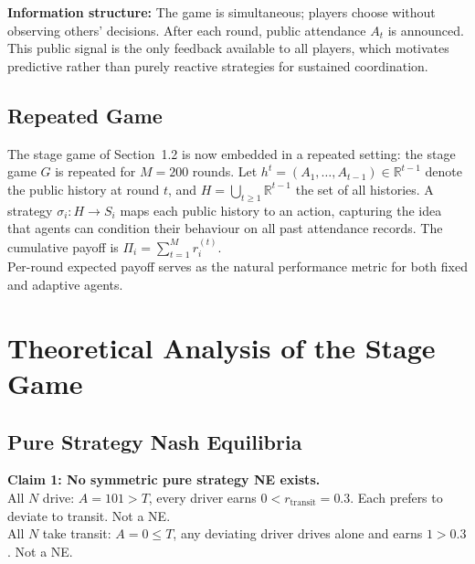 \textbf{Information structure:} The game is simultaneous; players choose without observing others' decisions. After each round, public attendance $A_t$ is announced. This public signal is the only feedback available to all players, which motivates predictive rather than purely reactive strategies for sustained coordination. \\

\subsection{Repeated Game}

The stage game of Section~1.2 is now embedded in a repeated setting: the stage game $G$ is repeated for $M = 200$ rounds. Let $h^t = (A_1, \ldots, A_{t-1}) \in \mathbb{R}^{t-1}$ denote the public history at round $t$, and $H = \bigcup_{t \geq 1} \mathbb{R}^{t-1}$ the set of all histories. A strategy $\sigma_i: H \to S_i$ maps each public history to an action, capturing the idea that agents can condition their behaviour on all past attendance records. The cumulative payoff is $\Pi_i = \sum_{t=1}^{M} r_i^{(t)}$. \\


Per-round expected payoff serves as the natural performance metric for both fixed and adaptive agents.\\

\section{Theoretical Analysis of the Stage Game}

\subsection{Pure Strategy Nash Equilibria}

\textbf{Claim 1: No symmetric pure strategy NE exists.} \\

All $N$ drive: $A = 101 > T$, every driver earns $0 < r_{\text{transit}} = 0.3$. Each prefers to deviate to transit. Not a NE. \\
All $N$ take transit: $A = 0 \leq T$, any deviating driver drives alone and earns $1 > 0.3$. Not a NE. \\

